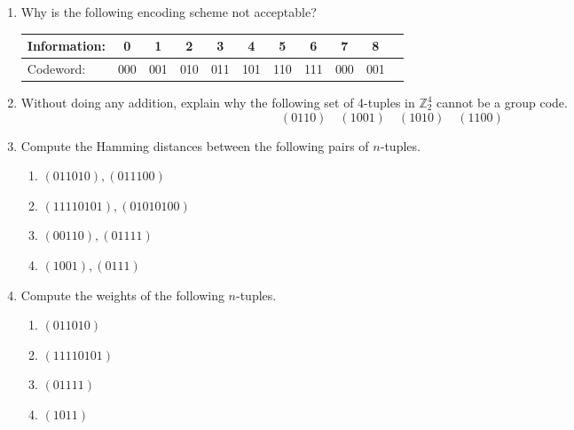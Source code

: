 {\small
\begin{enumerate}
 
 
\item
Why is the following encoding scheme not acceptable?
\begin{center}
\begin{tabular}{lcccccccccc}
\hline
Information: & 0 & 1 & 2 & 3 & 4 & 5 & 6 & 7 & 8 &
\\ \hline
Codeword: & 000 & 001 & 010 & 011 & 101 & 110
& 111 & 000 & 001 \\ \hline
\end{tabular}
\end{center}
 
 
\item
Without doing any addition, explain why the following set of 4-tuples in
${\mathbb Z}_2^4$ cannot be a group code. 
\[
(0110) \quad (1001) \quad (1010) \quad (1100)
\]
 
 
\item    %
Compute the Hamming distances between the following pairs of
$n$-tuples. 
\begin{multicols}{2}
\begin{enumerate}

\item
$(011010), (011100)$

\item
$(11110101), (01010100)$

\item
$(00110), (01111)$

\item
$(1001), (0111)$

\end{enumerate}
\end{multicols}


 
\item
Compute the weights of the following $n$-tuples.
\begin{multicols}{2}
\begin{enumerate}

\item
$(011010)$

\item
$(11110101)$

\item
$(01111)$

\item
$(1011)$

\end{enumerate}
\end{multicols}


\end{enumerate}}
